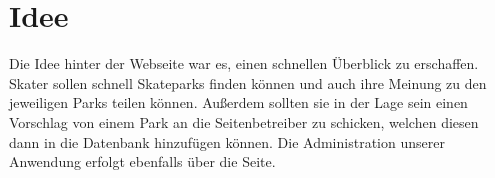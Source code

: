 \section{Idee}
\label{idee}

Die Idee hinter der Webseite war es, einen schnellen Überblick zu erschaffen. Skater sollen schnell 
Skateparks finden können und auch ihre Meinung zu den jeweiligen Parks teilen können. Außerdem sollten 
sie in der Lage sein einen Vorschlag von einem Park an die Seitenbetreiber zu schicken, welchen 
diesen dann in die Datenbank hinzufügen können. Die Administration unserer Anwendung erfolgt ebenfalls
über die Seite. 